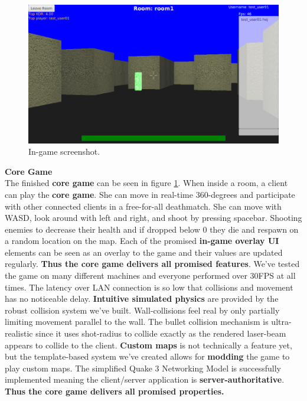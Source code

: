 \begin{figure}[htbp]
    \centering
    \includegraphics[width=\textwidth]{figures/room.png}
    \caption{In-game screenshot.}  
    \label{fig:game}
\end{figure}

\textbf{Core Game}\\
The finished \textbf{core game} can be seen in figure \ref{fig:game}.
When inside a room, a client can play the \textbf{core game}. She can move in real-time 360-degrees and participate with other connected clients in a free-for-all deathmatch. She can move with WASD, look around with left and right, and shoot by pressing spacebar. Shooting enemies to decrease their health and if dropped below 0 they die and respawn on a random location on the map.
Each of the promised \textbf{in-game overlay UI} elements can be seen as an overlay to the game and their values are updated regularly. \textbf{Thus the core game delivers all promised features}. We've tested the game on many different machines and everyone performed over 30FPS at all times. The latency over LAN connection is so low that collisions and movement has no noticeable delay. \textbf{Intuitive simulated physics} are provided by the robust collision system we've built. Wall-collisions feel real by only partially limiting movement parallel to the wall. The bullet collision mechanism is ultra-realistic since it uses shot-radius to collide exactly as the rendered laser-beam appears to collide to the client. \textbf{Custom maps} is not technically a feature yet, but the template-based system we've created allows for \textbf{modding} the game to play custom maps. The simplified Quake 3 Networking Model is successfully implemented meaning the client/server application is \textbf{server-authoritative}. \textbf{Thus the core game delivers all promised properties.}

